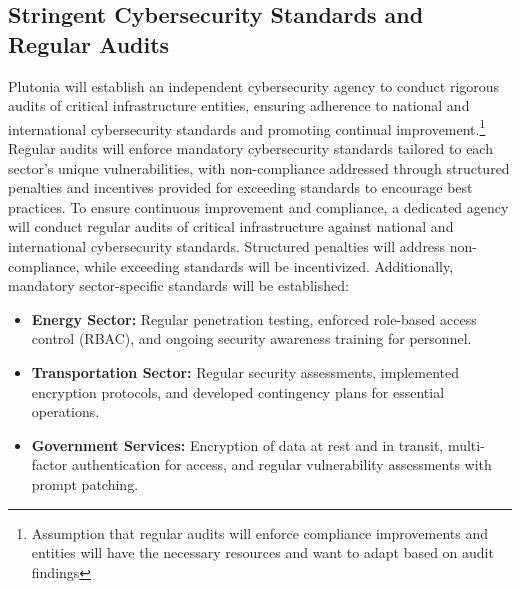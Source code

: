 \documentclass[
	a4paper, %
	10pt, %
]{CSSullivanBusinessReport}
\begin{document}
\begin{fullwidth}
\begin{justify}
\subsection{Stringent Cybersecurity Standards and Regular Audits}
Plutonia will establish an independent cybersecurity agency to conduct rigorous audits of critical infrastructure entities, ensuring adherence to national and international cybersecurity standards and promoting continual improvement.\footnote{Assumption that regular audits will enforce compliance improvements and entities will have the necessary resources and want to adapt based on audit findings} Regular audits will enforce mandatory cybersecurity standards tailored to each sector’s unique vulnerabilities, with non-compliance addressed through structured penalties and incentives provided for exceeding standards to encourage best practices. To ensure continuous improvement and compliance, a dedicated agency will conduct regular audits of critical infrastructure against national and international cybersecurity standards. Structured penalties will address non-compliance, while exceeding standards will be incentivized. Additionally, mandatory sector-specific standards will be established:
\begin{itemize}
	\item \textbf{Energy Sector:} Regular penetration testing, enforced role-based access control (RBAC), and ongoing security awareness training for personnel.
	\item \textbf{Transportation Sector:} Regular security assessments, implemented encryption protocols, and developed contingency plans for essential operations.
	\item \textbf{Government Services:} Encryption of data at rest and in transit, multi-factor authentication for access, and regular vulnerability assessments with prompt patching.
\end{itemize}

\end{justify}
\end{fullwidth}
\end{document}
